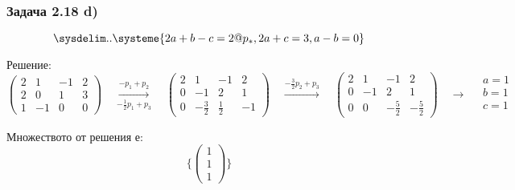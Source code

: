 \documentclass{subfiles}
\begin{document}
\subsubsection{Задача 2.18 d)}

\begin{equation*}
    \sysdelim..\systeme{
        2a + b - c = 2@p_{*},
        2a + c = 3,
        a - b = 0
    }
\end{equation*}

\noindent Решение:
\begin{equation*}
    \left(
        \begin{array}{ ccc|c }
            2 & 1  & -1 & 2 \\
            2 & 0  & 1  & 3 \\
            1 & -1 & 0  & 0
        \end{array}
    \right)
    \quad
    \overset{-p_{1}+p_{2}}{\underset{-\frac{1}{2}p_{1}+p_{3}}{\longrightarrow}}
    \quad
    \left(
        \begin{array}{ ccc|c }
            2 & 1               & -1            & 2 \\
            0 & -1              & 2             & 1 \\
            0 & -\frac{3}{2}    & \frac{1}{2}   & -1
        \end{array}
    \right)
    \quad
    \overset{-\frac{3}{2}p_{2}+p_{3}}{\longrightarrow}
    \quad
    \left(
        \begin{array}{ ccc|c }
            2 & 1  & -1           & 2 \\
            0 & -1 & 2            & 1 \\
            0 & 0  & -\frac{5}{2} & - \frac{5}{2}
        \end{array}
    \right)
    \quad
    \longrightarrow
    \quad
    \begin{array}{ c }
        a = 1 \\
        b = 1 \\
        c = 1 \\
    \end{array}
\end{equation*}

\noindent Множеството от решения е:
\begin{equation*}
    \{ \left(\begin{array}{ c } 1 \\ 1 \\ 1 \end{array}\right) \}
\end{equation*}
\end{document}
